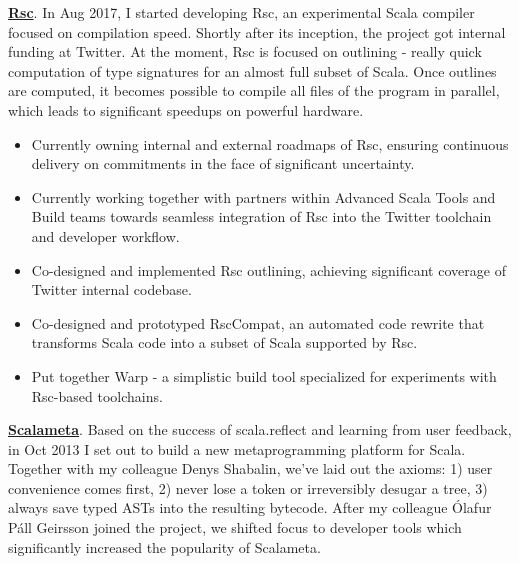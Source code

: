 \documentclass[margin, 10pt]{Stylesheet}
\begin{document}
\begin{resume}
\textbf{\href{https://github.com/twitter/rsc}{Rsc}}. In Aug 2017, I started developing Rsc,
an experimental Scala compiler focused on compilation speed. Shortly after its inception,
the project got internal funding at Twitter. At the moment, Rsc is focused on outlining - really
quick computation of type signatures for an almost full subset of Scala. Once outlines are computed,
it becomes possible to compile all files of the program in parallel, which leads to significant
speedups on powerful hardware.

\begin{itemize} \itemsep -2pt
\item Currently owning internal and external roadmaps of Rsc, ensuring continuous delivery
on commitments in the face of significant uncertainty.
\item Currently working together with partners within Advanced Scala Tools and Build teams towards
seamless integration of Rsc into the Twitter toolchain and developer workflow.
\item Co-designed and implemented Rsc outlining, achieving significant coverage of Twitter internal
codebase.
\item Co-designed and prototyped RscCompat, an automated code rewrite that transforms Scala code
into a subset of Scala supported by Rsc.
\item Put together Warp - a simplistic build tool specialized for experiments with Rsc-based
toolchains.
\end{itemize}

\textbf{\href{http://scalameta.org/}{Scalameta}}. Based on the success of scala.reflect and
learning from user feedback, in Oct 2013 I set out to build a new metaprogramming platform for
Scala. Together with my colleague Denys Shabalin, we've laid out the axioms: 1) user convenience
comes first, 2) never lose a token or irreversibly desugar a tree, 3) always save typed ASTs into
the resulting bytecode. After my colleague \'{O}lafur P\'{a}ll Geirsson joined the project, we
shifted focus to developer tools which significantly increased the popularity of Scalameta.


\end{resume}
\end{document}
